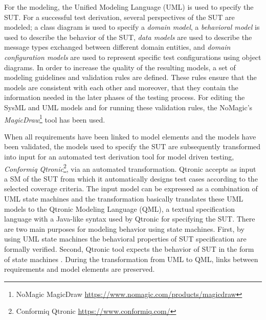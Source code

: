 For the modeling, the Unified Modeling Language (UML) is used to specify the SUT. For a successful test derivation, several perspectives of the SUT are modeled; a class diagram is used to specify a \textit{domain model}, a \textit{behavioral model} is used to describe the behavior of the SUT, \textit{data models} are used to describe the message types exchanged between different domain entities, and \textit{domain configuration models} are used to represent specific test configurations using object diagrams. In order to increase the quality of the resulting models, a set of modeling guidelines and validation rules are defined. These rules ensure that the models are consistent with each other and moreover, that they contain the information needed in the later phases of the testing process. For editing the SysML and UML models and for running these validation rules, the NoMagic’s \textit{MagicDraw}\footnote{NoMagic MagicDraw \url{https://www.nomagic.com/products/magicdraw}} tool has been used. 

When all requirements have been linked to model elements and the models have been validated, the models used to specify the SUT are subsequently transformed into input for an automated test derivation tool for model driven testing, \textit{Conformiq Qtronic}\footnote{Conformiq Qtronic \url{https://www.conformiq.com/}}, via an automated transformation. Qtronic accepts as input a SM of the SUT from which it automatically designs test cases according to the selected coverage criteria. The input model can be expressed as a combination of UML state machines \cite{SMvsTM} and the transformation basically translates these UML models to the Qtronic Modeling Language (QML), a textual specification language with a Java-like syntax used by Qtronic for specifying the SUT. There are two main purposes for modeling behavior using state machines. First, by using UML state machines the behavioral properties of SUT specification are formally verified. Second, Qtronic tool expects the behavior of SUT in the form of state machines \cite{traqml}. During the transformation from UML to QML, links between requirements and model elements are preserved. 

